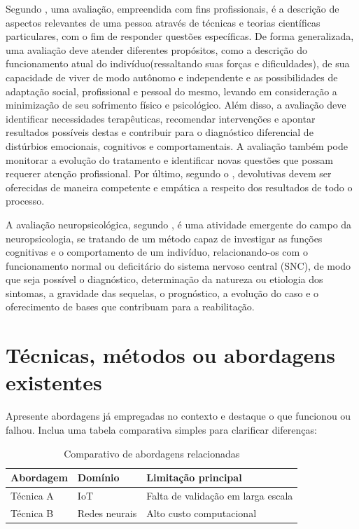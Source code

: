 \documentclass[
    12pt,
    openright,
    oneside,
    a4paper,
    english,
    brazil
]{abntex2}
\begin{document}
Segundo , uma avaliação, empreendida com fins profissionais, é a descrição de aspectos relevantes de uma pessoa através de técnicas e teorias científicas particulares, com o fim de responder questões específicas. De forma generalizada, uma avaliação deve atender diferentes propósitos, como a descrição do funcionamento atual do indivíduo(ressaltando suas forças e dificuldades), de sua capacidade de viver de modo autônomo e independente e as possibilidades de adaptação social, profissional e pessoal do mesmo, levando em consideração a minimização de seu sofrimento físico e psicológico. Além disso, a avaliação deve identificar necessidades terapêuticas, recomendar intervenções e apontar resultados possíveis destas e contribuir para o diagnóstico diferencial de distúrbios emocionais, cognitivos e comportamentais. A avaliação também pode monitorar a evolução do tratamento e identificar novas questões que possam requerer atenção profissional. Por último, segundo o , devolutivas devem ser oferecidas de maneira competente e empática a respeito dos resultados de todo o processo. 

A avaliação neuropsicológica, segundo , é uma atividade emergente do campo da neuropsicologia, se tratando de um método capaz de investigar as funções cognitivas e o comportamento de um indivíduo, relacionando-os com o funcionamento normal ou deficitário do sistema nervoso central (SNC), de modo que seja possível o diagnóstico, determinação da natureza ou etiologia dos sintomas, a gravidade das sequelas, o prognóstico, a evolução do caso e o oferecimento de bases que contribuam para a reabilitação.

\section{Técnicas, métodos ou abordagens existentes}
Apresente abordagens já empregadas no contexto e destaque o que funcionou ou falhou. Inclua uma tabela comparativa simples para clarificar diferenças:
\begin{table}[htb]
  \centering
  \caption{Comparativo de abordagens relacionadas}
  \begin{tabular}{p{4cm}p{3cm}p{4cm}}
    \toprule
    Abordagem & Domínio & Limitação principal \\
    \midrule
    Técnica A & IoT & Falta de validação em larga escala \\
    Técnica B & Redes neurais & Alto custo computacional \\
    \bottomrule
  \end{tabular}
\end{table}
\end{document}
